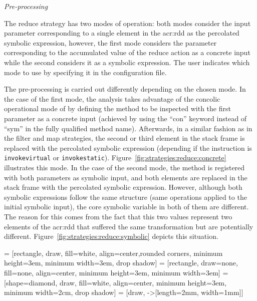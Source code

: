 \textit{Pre-processing}

The reduce strategy has two modes of operation: both modes consider the input parameter corresponding to a single element in the \acrshort{acr:rdd} as the percolated symbolic expression, however, the first mode considers the parameter corresponding to the accumulated value of the reduce action as a concrete input while the second considers it as a symbolic expression. The user indicates which mode to use by specifying it in the configuration file.

The pre-processing is carried out differently depending on the chosen mode. In the case of the first mode, the analysis takes advantage of the concolic operational mode of \spf{} by defining the method to be inspected with the first parameter as a concrete input (achieved by using the ``con'' keyword instead of ``sym'' in the fully qualified method name). Afterwards, in a similar fashion as in the filter and map strategies, the second or third element in the stack frame is replaced with the percolated symbolic expression (depending if the instruction is \texttt{invokevirtual} or \texttt{invokestatic}). Figure~\ref{fig:strategies:reduce:concrete} illustrates this mode. In the case of the second mode, the method is registered with both parameters as symbolic input, and both elements are replaced in the stack frame with the percolated symbolic expression. However, although both symbolic expressions follow the same structure (same operations applied to the initial symbolic input), the core symbolic variable in both of them are different. The reason for this comes from the fact that this two values represent two elements of the \acrshort{acr:rdd} that suffered the same transformation but are potentially different. Figure~\ref{fig:strategies:reduce:symbolic} depicts this situation.

 = [rectangle, draw, fill=white, align=center,rounded corners, minimum height=3em, minimum width=3em, drop shadow]
 = [rectangle, draw=none, fill=none, align=center, minimum height=3em, minimum width=3em]
 = [shape=diamond, draw, fill=white, align=center, minimum height=3em, minimum width=2cm, drop shadow]
 = [draw, -{>[length=2mm, width=1mm]}]

